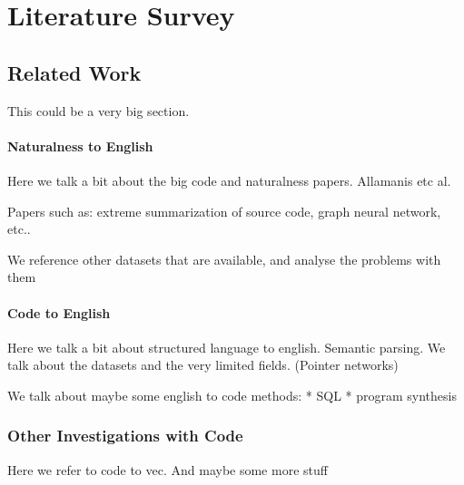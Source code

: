 \chapter{Literature Survey}
\label{literature_survey}

\section{Related Work} %

This could be a very big section. 

\subsubsection{Naturalness to English} %
\label{ssub:naturalness_to_english}

Here we talk a bit about the big code and naturalness papers. Allamanis etc al.

Papers such as: extreme summarization of source code, graph neural network, etc..

We reference other datasets that are available, and analyse the problems with them


\subsubsection{Code to English} %
\label{ssub:code_to_english}

Here we talk a bit about structured language to english. Semantic parsing. We talk about the datasets and the very limited fields. (Pointer networks)

We talk about maybe some english to code methods:
* SQL
* program synthesis

\subsection{Other Investigations with Code} %
\label{sub:other_investigations_with_code}

Here we refer to code to vec.
And maybe some more stuff

\label{sec:related_work}